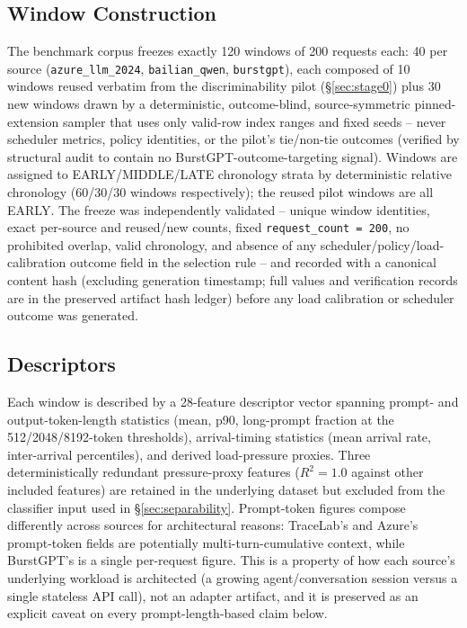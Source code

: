 \subsection{Window Construction}
\label{sec:windows}

The benchmark corpus freezes exactly 120 windows of 200 requests each: 40
per source (\texttt{azure\_llm\_2024}, \texttt{bailian\_qwen},
\texttt{burstgpt}), each composed of 10 windows reused verbatim from the
discriminability pilot (\S\ref{sec:stage0}) plus 30 new windows drawn by a
deterministic, outcome-blind, source-symmetric pinned-extension sampler
that uses only valid-row index ranges and fixed seeds -- never scheduler
metrics, policy identities, or the pilot's tie/non-tie outcomes (verified
by structural audit to contain no BurstGPT-outcome-targeting signal).
Windows are assigned to EARLY/MIDDLE/LATE chronology strata by
deterministic relative chronology (60/30/30 windows respectively); the
reused pilot windows are all EARLY. The freeze was independently
validated -- unique window identities, exact per-source and reused/new
counts, fixed \texttt{request\_count = 200}, no prohibited overlap, valid
chronology, and absence of any scheduler/policy/load-calibration outcome
field in the selection rule -- and recorded with a canonical content hash
(excluding generation timestamp; full values and verification records are
in the preserved artifact hash ledger) before any load calibration or
scheduler outcome was generated.

\subsection{Descriptors}
\label{sec:descriptors}

Each window is described by a 28-feature descriptor vector spanning prompt-
and output-token-length statistics (mean, p90, long-prompt fraction at the
512/2048/8192-token thresholds), arrival-timing statistics (mean arrival
rate, inter-arrival percentiles), and derived load-pressure proxies. Three
deterministically redundant pressure-proxy features ($R^2=1.0$ against
other included features) are retained in the underlying dataset but
excluded from the classifier input used in \S\ref{sec:separability}.
Prompt-token figures compose differently across sources for architectural
reasons: TraceLab's and Azure's prompt-token fields are potentially
multi-turn-cumulative context, while BurstGPT's is a single per-request
figure. This is a property of how each source's underlying workload is
architected (a growing agent/conversation session versus a single stateless
API call), not an adapter artifact, and it is preserved as an explicit
caveat on every prompt-length-based claim below.


